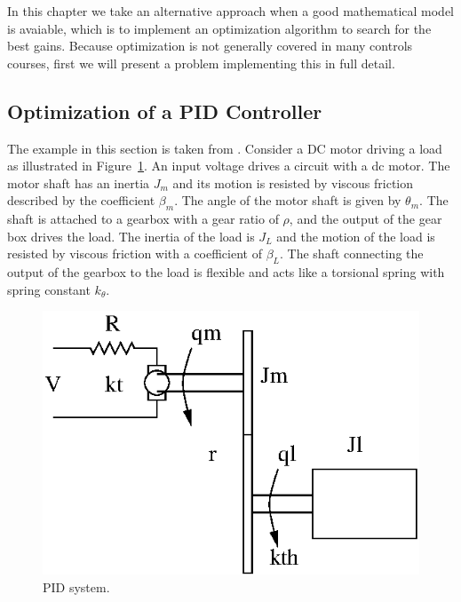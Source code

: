 In this chapter we take an alternative approach when a good mathematical model is avaiable, which is to implement an optimization algorithm to search for the best gains. Because optimization is not generally covered in many controls courses, first we will present a problem implementing this in full detail.

\subsection{Optimization of a PID Controller}
The example in this section is taken from \cite{YQChenAcc}. Consider a DC motor driving a load as illustrated in Figure~\ref{fig:PIDex}. An input voltage drives a circuit with a dc motor. The motor shaft has an inertia $J_m$ and its motion is resisted by viscous friction described by the coefficient $\beta_m$. The angle of the motor shaft is given by $\theta_m$. The shaft is attached to a gearbox with a gear ratio of $\rho$, and the output of the gear box drives the load. The inertia of the load is $J_L$ and the motion of the load is resisted by viscous friction with a coefficient of $\beta_L$. The shaft connecting the output of the gearbox to the load is flexible and acts like a torsional spring with spring constant $k_\theta$. 

\begin{figure}
  \centering
  \includegraphics{figs/PIDex}
  \caption{PID system.}
  \label{fig:PIDex}
\end{figure}

